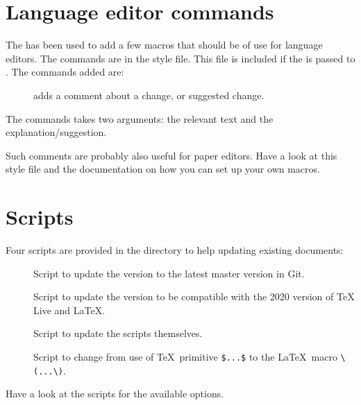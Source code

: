 \section{Language editor commands}%
\label{sec:langedit}

The  has been used to add a few macros that should be of use
for language editors. The commands are in the  style file.
This file is included if the  is passed to .
The commands added are:
\begin{description}
  \item[] adds a comment about a change, or suggested change.
\end{description}
The commands takes two arguments: the relevant text and the explanation/suggestion.

Such comments are probably also useful for paper editors.
Have a look at this style file and the  documentation on how
you can set up your own macros.


\section{Scripts}%
\label{sec:script}

Four scripts are provided in the  directory to help updating existing documents:
\begin{description}
  \item[] Script to update the  version
    to the latest master version in Git.
  \item[] Script to update the  version
    to be compatible with the 2020 version of TeX Live and \LaTeX.
  \item[] Script to update the scripts themselves.
  \item[] Script to change from use of \TeX\ primitive \verb|$...$|
    to the \LaTeX\ macro \verb|\(...\)|.
\end{description}
Have a look at the scripts for the available options.


